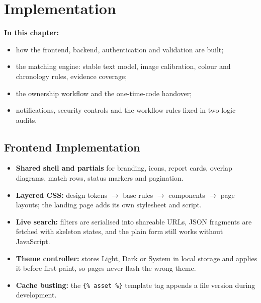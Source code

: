 \documentclass[12pt,a4paper,oneside]{report}
\newcommand{\code}[1]{\texttt{#1}}
\begin{document}
\chapter{Implementation}
\textbf{In this chapter:}
\begin{itemize}[beginpenalty=10000]
  \item how the frontend, backend, authentication and validation are built;
  \item the matching engine: stable text model, image calibration, colour and chronology rules, evidence coverage;
  \item the ownership workflow and the one-time-code handover;
  \item notifications, security controls and the workflow rules fixed in two logic audits.
\end{itemize}

\section{Frontend Implementation}
\begin{itemize}
  \item \textbf{Shared shell and partials} for branding, icons, report cards, overlap diagrams, match rows, status markers and pagination.
  \item \textbf{Layered CSS:} design tokens $\rightarrow$ base rules $\rightarrow$ components $\rightarrow$ page layouts; the landing page adds its own stylesheet and script.
  \item \textbf{Live search:} filters are serialised into shareable URLs, JSON fragments are fetched with skeleton states, and the plain form still works without JavaScript.
  \item \textbf{Theme controller:} stores Light, Dark or System in local storage and applies it before first paint, so pages never flash the wrong theme.
  \item \textbf{Cache busting:} the \code{\{\% asset \%\}} template tag appends a file version during development.
\end{itemize}
\end{document}
